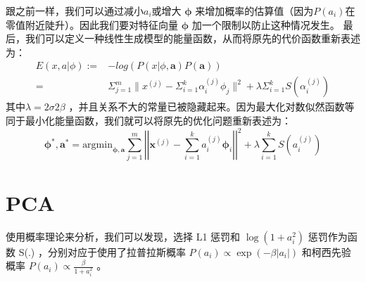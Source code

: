 跟之前一样，我们可以通过减小$a_i$或增大 $\mathbf{\phi}$ 来增加概率的估算值（因为$P(a_i)$在零值附近陡升）。因此我们要对特征向量 $\mathbf{\phi}$ 加一个限制以防止这种情况发生。
最后，我们可以定义一种线性生成模型的能量函数，从而将原先的代价函数重新表述为：
\begin{align}
E(x,a|\phi):=&-log(P(x|\phi,\mathbf{a})P(\mathbf{a}))\\
            =&\Sigma_{j=1}^m\|x^{(j)}-\Sigma_{i=1}^k\alpha_i^{(j)}\phi_j\|^2+\lambda\Sigma_{i=1}^{k}S(\alpha_i^{(j)})
\end{align}
其中$\lambda = 2\sigma2\beta$ ，并且关系不大的常量已被隐藏起来。因为最大化对数似然函数等同于最小化能量函数，我们就可以将原先的优化问题重新表述为：
\begin{equation}
\mathbf{\phi}^{*},\mathbf{a}^{*}=\text{argmin}_{\mathbf{\phi},\mathbf{a}} \sum_{j=1}^{m} \left|\left| \mathbf{x}^{(j)} - \sum_{i=1}^k a^{(j)}_i \mathbf{\phi}_{i}\right|\right|^{2} + \lambda \sum_{i=1}^{k}S(a^{(j)}_i) 
\end{equation}

\section{PCA}
使用概率理论来分析，我们可以发现，选择 L1 惩罚和 $\log(1+a_i^2)$ 惩罚作为函数 S(.) ，分别对应于使用了拉普拉斯概率 $P(a_i) \propto \exp\left(-\beta|a_i|\right)$ 和柯西先验概率 $P(a_i) \propto \frac{\beta}{1+a_i^2}$ 。
